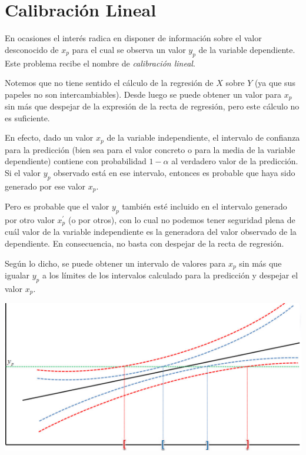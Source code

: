 \documentclass[10pt,a4paper]{book}
\begin{document}
	\section{Calibración Lineal}
En ocasiones el interés radica en disponer de información sobre el valor desconocido de $x_p$ para el cual se observa un valor $y_p$ de la variable dependiente. Este problema recibe el nombre de \textit{calibración lineal}.

Notemos que no tiene sentido el cálculo de la regresión de $X$ sobre $Y$ (ya que sus papeles no son intercambiables). Desde luego se puede obtener un valor para $x_p$ sin más que despejar de la expresión de la recta de regresión, pero este cálculo no es suficiente.

En efecto, dado un valor $x_p$ de la variable independiente, el intervalo de confianza para la predicción (bien sea para el valor concreto o para la media de la variable dependiente) contiene con probabilidad $1-\alpha$ al verdadero valor de la predicción. Si el valor $y_p$ observado está en ese intervalo, entonces es probable que haya sido generado por ese valor $x_p$.

Pero es probable que el valor $y_p$ también esté incluido en el intervalo generado por otro valor $x^\mathrm{'}_p$ (o por otros), con lo cual no podemos tener seguridad plena de cuál valor de la variable independiente es la generadora del valor observado de la dependiente. En consecuencia, no basta con despejar de la recta de regresión.

Según lo dicho, se puede obtener un intervalo de valores para $x_p$ sin más que igualar $y_p$ a los límites de los intervalos calculado para la predicción y despejar el valor $x_p$.

\begin{center}
\includegraphics[scale=.6]{imagenes/tema3_5.png} 
\end{center}
\end{document}
